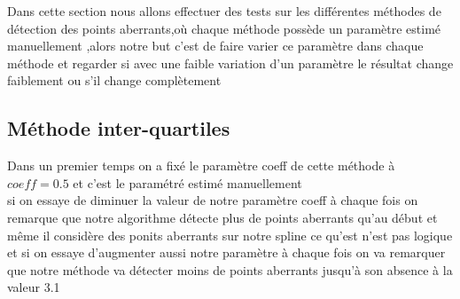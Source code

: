 \documentclass[11pt]{report}
\begin{document}
Dans cette section nous allons effectuer des tests sur les différentes méthodes de détection des points aberrants,où chaque méthode possède un paramètre estimé manuellement ,alors notre but  c'est de faire varier ce paramètre dans chaque méthode et regarder si avec une faible variation d'un paramètre le résultat change faiblement ou s'il change complètement

\subsection*{Méthode inter-quartiles}
Dans un premier temps on a fixé le paramètre  coeff de cette méthode à $coeff=0.5$ et c'est le paramétré estimé manuellement \\
si on essaye de diminuer la valeur de notre paramètre coeff à chaque fois on remarque que  notre algorithme détecte plus de points aberrants qu'au début  et même il considère des ponits aberrants sur notre spline ce qu'est n'est pas logique \\
et si on essaye d'augmenter aussi notre paramètre à chaque fois on va remarquer que notre méthode va détecter moins de points aberrants jusqu'à son absence à la valeur 3.1 \\\vspace{2cm}
\end{document}
